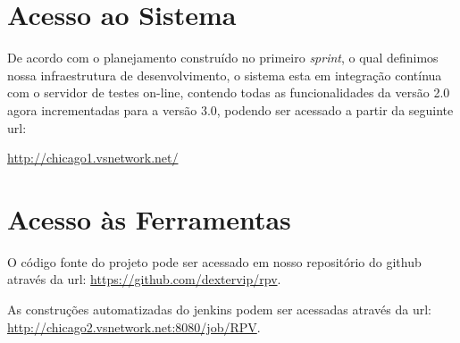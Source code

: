 \documentclass{abnt}
\begin{document}
		 		 
\clearpage
	\section{Acesso ao Sistema}
			De acordo com o planejamento construído no primeiro \emph{sprint}, o qual definimos nossa infraestrutura de desenvolvimento, 
			o sistema esta em integração contínua com o servidor de testes on-line, contendo todas as funcionalidades da versão 2.0 agora incrementadas para a versão 3.0, 
			podendo ser acessado a partir da seguinte url:
		
			\url{http://chicago1.vsnetwork.net/}
			
			
			

	\section{Acesso às Ferramentas}
		
		O código fonte do projeto pode ser acessado em nosso repositório do github\cite{GITHUB} através da url: \url{https://github.com/dextervip/rpv}. 
		
		As construções automatizadas do jenkins podem ser acessadas através da url: \url{http://chicago2.vsnetwork.net:8080/job/RPV}.

	\clearpage

	\nocite{*}
	
			
\end{document}
